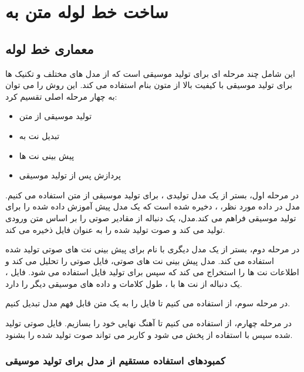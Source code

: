 
\chapter{ساخت خط لوله متن به }
\section{معماری خط‌ لوله}

این  شامل چند مرحله ای برای تولید موسیقی است که از مدل های مختلف و تکنیک ها برای تولید موسیقی با کیفیت بالا از متون بنام استفاده می کند. این روش را می توان به چهار مرحله اصلی تقسیم کرد:
\begin{itemize}
      \item  تولید موسیقی از متن
      \item  تبدیل نت به 
      \item پیش بینی نت ها
      \item پردازش پس از تولید موسیقی
\end{itemize}

در مرحله اول، بستر از یک مدل تولیدی   \cite{copet2023simple} ، برای تولید موسیقی از متن استفاده می کنیم. مدل در داده مورد نظر، ، دخیره شده است که یک مدل پیش آموزش‌ داده شده را برای تولید موسیقی فراهم می کند.مدل، یک دنباله از مقادیر صوتی را بر اساس متن ورودی تولید می کند و صوت تولید شده را به عنوان فایل  ذخیره می کند.

در مرحله دوم، بستر از یک مدل دیگری با نام  \cite{2022_BittnerBRME_LightweightNoteTranscription_ICASSP} برای پیش بینی نت های صوتی تولید شده استفاده می کند. مدل پیش بینی نت های صوتی، فایل صوتی را تحلیل می کند و اطلاعات نت ها را استخراج می کند که سپس برای تولید فایل  استفاده می شود. فایل ، یک دنباله از نت ها با ، طول کلامات و داده های موسیقی دیگر را دارد.



در مرحله سوم، از   استفاده می کنیم تا فایل  را به یک متن قابل فهم مدل تبدیل کنیم.

در مرحله چهارم، از  استفاده می کنیم تا آهنگ نهایی خود را بسازیم.
فایل صوتی تولید شده سپس با استفاده از  پخش می شود و کاربر می تواند صوت تولید شده را بشنود.

\subsection{کمبودهای استفاده مستقیم از مدل  برای تولید موسیقی}

